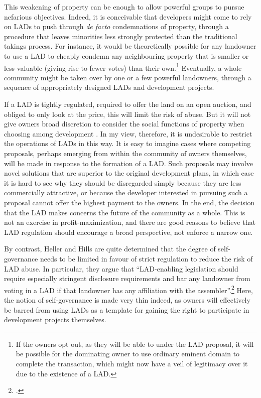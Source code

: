 This weakening of property can be enough to allow powerful groups to pursue nefarious objectives. Indeed, it is conceivable that developers might come to rely on LADs to push through {\it de facto} condemnations of property, through a procedure that leaves minorities less strongly protected than the traditional takings process. For instance, it would be theoretically possible for any landowner to use a LAD to cheaply condemn any neighbouring property that is smaller or less valuable (giving rise to fewer votes) than their own.\footnote{If the owners opt out, as they will be able to under the LAD proposal, it will be possible for the dominating owner to use ordinary eminent domain to complete the transaction, which might now have a veil of legitimacy over it due to the existence of a LAD.} Eventually, a whole community might be taken over by one or a few powerful landowners, through a sequence of appropriately designed LADs and development projects. %

If a LAD is tightly regulated, required to offer the land on an open auction, and obliged to only look at the price, this will limit the risk of abuse. But it will not give owners broad discretion to consider the social functions of property when choosing among development . In my view, therefore, it is undesirable to restrict the operations of LADs in this way. It is easy to imagine cases where competing proposals, perhaps emerging from within the community of owners themselves, will be made in response to the formation of a LAD. Such proposals may involve novel solutions that are superior to the original development plans, in which case it is hard to see why they should be disregarded simply because they are less commercially attractive, or because the  developer interested in pursuing such a proposal cannot offer the highest payment to the owners. In the end, the decision that the LAD makes concerns the future of the community as a whole. This is not an exercise in profit-maximization, and there are good reasons to believe that LAD regulation should encourage a broad perspective, not enforce a narrow one.

By contrast, Heller and Hills are quite determined that the degree of self-governance needs to be limited in favour of strict regulation to reduce the risk of LAD abuse. In particular, they argue that ``LAD-enabling legislation should require especially stringent disclosure requirements and bar any landowner from voting in a LAD if that landowner has any affiliation with the assembler''.\footcite{heller08} Here, the notion of self-governance is made very thin indeed, as owners will effectively be barred from using LADs as a template for gaining the right to participate in development projects themselves.


